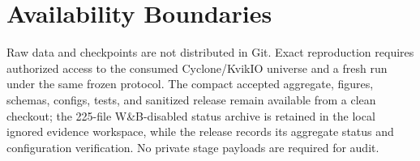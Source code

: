\section{Availability Boundaries}

Raw data and checkpoints are not distributed in Git. Exact reproduction requires authorized access
to the consumed Cyclone/KvikIO universe and a fresh run under the same frozen protocol. The compact
accepted aggregate, figures, schemas, configs, tests, and sanitized release remain available from a
clean checkout; the 225-file W\&B-disabled status archive is retained in the local ignored evidence
workspace, while the release records its aggregate status and configuration verification. No
private stage payloads are required for audit.
